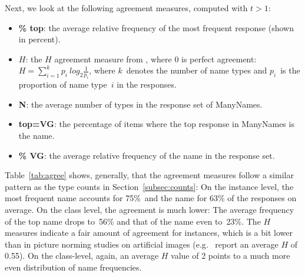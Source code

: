 Next, we look at the following agreement measures, computed with $t>1$: 
\begin{itemize}
\item \textbf{\% top}: the average relative frequency of the most frequent response (shown in percent).
\item \textbf{$H$}: the $H$ agreement measure from \cite{snodgrass}, where 0 is perfect agreement: \mbox{$H = \sum_{i=1}^k p_i~log_2\frac{1}{p_i}$}, 
where $k$\ denotes the number of name types and $p_i$\ is the proportion of name type\ $i$ in the responses. \item \textbf{N}: the average number of types in the response set of ManyNames.
\item \textbf{top=VG}: the percentage of items where the top response in ManyNames is the \vg name.
\item \textbf{\% VG}: the average relative frequency of the \vg name in the response set.
\end{itemize}


Table\ \ref{tab:agree} shows, generally, that the agreement measures follow a similar pattern as the type counts in Section\ \ref{subsec:counts}:
On the instance level, %
the most frequent name accounts for 75\%\  and the \vg name for 63\% of the responses on average. On the class level, the agreement is much lower: The average frequency of the top name drops to\ 56\% and that of the \vg name even to\ 23\%. The $H$ measures indicate a fair amount of agreement for instances, which is a bit lower than in picture norming studies on artificial images (e.g.\  report an average $H$ of 0.55). On the class-level, again, an average $H$ value of 2 points to a much more even distribution of name frequencies.


